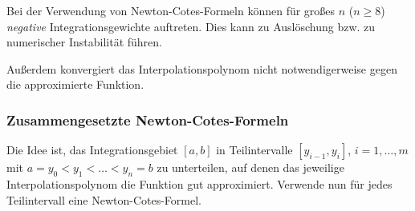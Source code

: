 \begin{bemn}[Probleme.]
Bei der Verwendung von Newton-Cotes-Formeln können für großes $n$ ($n\ge 8$)
\textit{negative} Integrationsgewichte auftreten. Dies kann zu Auslöschung
bzw. zu numerischer Instabilität führen. 

Außerdem konvergiert das Interpolationspolynom nicht notwendigerweise gegen die
approximierte Funktion.
\end{bemn}

\subsubsection{Zusammengesetzte Newton-Cotes-Formeln}

Die Idee ist, das Integrationsgebiet $[a,b]$ in Teilintervalle $[y_{i-1},y_i]$,
$i=1,\ldots,m$ mit $a=y_0<y_1<\ldots<y_n =b$ zu unterteilen, auf denen das
jeweilige Interpolationspolynom die Funktion gut approximiert.
Verwende nun für jedes Teilintervall eine Newton-Cotes-Formel.
